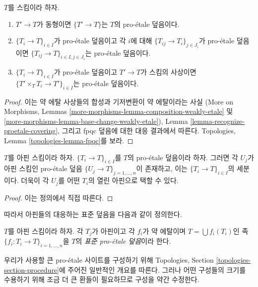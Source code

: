 \begin{lemma}
\label{lemma-proetale}
$T$를 스킴이라 하자.
\begin{enumerate}
\item $T' \to T$가 동형이면 $\{T' \to T\}$는 $T$의 pro-\'etale 덮음이다.
\item $\{T_i \to T\}_{i\in I}$가 pro-\'etale 덮음이고 각 $i$에 대해
$\{T_{ij} \to T_i\}_{j\in J_i}$가 pro-\'etale 덮음이면
$\{T_{ij} \to T\}_{i \in I, j\in J_i}$는 pro-\'etale 덮음이다.
\item $\{T_i \to T\}_{i\in I}$가 pro-\'etale 덮음이고 $T' \to T$가
스킴의 사상이면 $\{T' \times_T T_i \to T'\}_{i\in I}$는
pro-\'etale 덮음이다.
\end{enumerate}
\end{lemma}

\begin{proof}
이는 약 에탈 사상들의 합성과 기저변환이 약 에탈이라는 사실
(More on Morphisms, Lemmas
\ref{more-morphisms-lemma-composition-weakly-etale} 및
\ref{more-morphisms-lemma-base-change-weakly-etale}),
Lemma \ref{lemma-recognize-proetale-covering}, 그리고 fpqc 덮음에 대한
대응 결과에서 따른다. Topologies, Lemma
\ref{topologies-lemma-fpqc}를 보라.
\end{proof}

\begin{lemma}
\label{lemma-proetale-affine}
$T$를 아핀 스킴이라 하자. $\{T_i \to T\}_{i \in I}$를 $T$의
pro-\'etale 덮음이라 하자. 그러면 각 $U_j$가 아핀 스킴인
pro-\'etale 덮음 $\{U_j \to T\}_{j = 1, \ldots, n}$이 존재하고,
이는 $\{T_i \to T\}_{i \in I}$의 세분이다. 더욱이 각 $U_j$를
어떤 $T_i$의 열린 아핀으로 택할 수 있다.
\end{lemma}

\begin{proof}
이는 정의에서 직접 따른다.
\end{proof}

\noindent
따라서 아핀들의 대응하는 표준 덮음을 다음과 같이 정의한다.

\begin{definition}
\label{definition-standard-proetale}
$T$를 아핀 스킴이라 하자. 각 $T_j$가 아핀이고 각 $f_i$가 약 에탈이며
$T = \bigcup f_i(T_i)$인 족
$\{f_i : T_i \to T\}_{i = 1, \ldots, n}$을 $T$의
{\it 표준 pro-\'etale 덮음}이라 한다.
\end{definition}

\noindent
우리가 사용할 큰 pro-\'etale 사이트를 구성하기 위해 Topologies,
Section \ref{topologies-section-procedure}에 주어진 일반적인 개요를 따른다.
그러나 어떤 구성들의 크기를 수용하기 위해 조금 더 큰 환들이 필요하므로
구성을 약간 수정한다.

